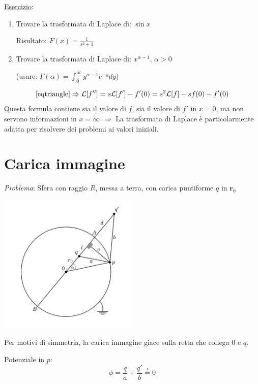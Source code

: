 \documentclass[a4paper,11pt]{report}
\newcommand{\vect}[1]{\boldsymbol{#1}}
\begin{document}
\medskip

\underline{Esercizio}:
\begin{enumerate}
\item Trovare la trasformata di Laplace di: $\sin x$

Risultato: $F(x)=\frac{1}{s^2+1}$
\item Trovare la trasformata di Laplace di: $x^{\alpha -1}$, $\alpha>0$

(usare: $\Gamma(\alpha)=\int_0^{\infty} y^{\alpha -1} e^{-y} dy$)
\end{enumerate}

\[
\eqref{eqtriangle} \Rightarrow \mathcal{L}[f'']=s\mathcal{L}[f']-f'(0)=s^2\mathcal{L}[f]-sf(0)-f'(0)
\]
Questa formula contiene sia il valore di $f$, sia il valore di $f'$ in $x=0$, ma non servono informazioni in $x=\infty$ $\Rightarrow$ La trasformata di Laplace \`e particolarmente adatta per risolvere dei problemi ai valori iniziali.

\appendix

\chapter{Carica immagine} \label{caricaimm}

\emph{Problema}: Sfera con raggio $R$, messa a terra, con carica puntiforme $q$ in $\vect{r}_0$

\begin{center}
\includegraphics[width=0.5\textwidth]{immagini/caricaimmagine}
\end{center}

Per motivi di simmetria, la carica immagine giace sulla retta che collega 0 e $q$.

Potenziale in $p$:
\begin{equation}
\phi = \frac{q}{a}+\frac{q'}{b} \overset{!}{=} 0
\label{A1}
\end{equation}
\end{document}
